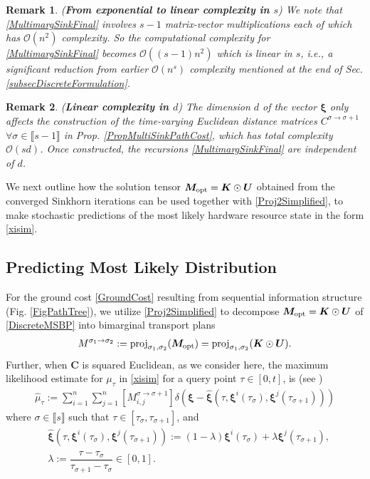 \documentclass[letterpaper, 10pt, twocolumn]{ieeeconf}      %
\newtheorem{remark}{Remark}
\begin{document}
\begin{remark}(\textbf{From exponential to linear complexity in $s$})
We note that \eqref{MultimargSinkFinal} involves $s-1$ matrix-vector multiplications each of which has $\mathcal{O}(n^2)$ complexity. So the computational complexity for \eqref {MultimargSinkFinal} becomes $\mathcal{O}\left((s-1)n^2\right)$ which is linear in $s$, i.e., a significant reduction from earlier $\mathcal{O}\left(n^{s}\right)$ complexity mentioned at the end of Sec. \ref{subsecDiscreteFormulation}.
\end{remark}
\begin{remark}(\textbf{Linear complexity in $d$})
The dimension $d$ of the vector $\bm{\xi}$ only affects the construction of the time-varying Euclidean distance matrices $C^{\sigma\rightarrow\sigma+1}$ $\forall\sigma\in\llbracket s-1\rrbracket$ in Prop. \ref{PropMultiSinkPathCost}, which has total complexity $\mathcal{O}(sd)$. Once constructed, the recursions \eqref {MultimargSinkFinal} are independent of $d$.
\end{remark}
We next outline how the solution tensor $\bm{M}_{\rm{opt}}=\bm{K}\odot\bm{U}$ obtained from the converged Sinkhorn iterations can be used together with \eqref{Proj2Simplified}, to make stochastic predictions of the most likely hardware resource state in the form \eqref{xisim}.

\subsection{Predicting Most Likely Distribution }\label{subsec:Prediction}
\noindent
For the ground cost \eqref{GroundCost} resulting from sequential information structure (Fig. \ref{FigPathTree}), we utilize \eqref{Proj2Simplified} to decompose $\bm{M}_{\rm{opt}} = \bm{K}\odot\bm{U}$ of \eqref{DiscreteMSBP} into bimarginal transport plans
\begin{align}
    M^{\sigma_1\to\sigma_2}:={\rm{proj}}_{\sigma_1,\sigma_2}(\bm{M}_{\rm{opt}})={\rm{proj}}_{\sigma_1,\sigma_2}(\bm{K}\odot\bm{U}).
\label{BimarginalPlanM}
\end{align}
Further, when $\bm{C}$ is squared Euclidean, as we consider here, the maximum likelihood estimate for $\mu_{\tau}$ in \eqref{xisim} for a query point $\tau\in[0,t]$, is (see \cite[Sec. 2.2]{elvander2020multi})
\begin{align}
    \!\hat{\mu}_\tau \!:=\!\sum_{i=1}^n\!\sum_{j=1}^n \!\left[\!M^{\sigma\to\sigma+1}_{i,j}\!\right]\!\!\delta(\bm{\xi}-\hat{\bm{\xi}}(\tau,\bm{\xi}^{i}(\tau_{\sigma}),\bm{\xi}^{j}(\tau_{\sigma+1})))
\label{MuInterpolation}
\end{align}
where $\sigma\in\llbracket s\rrbracket$ such that $\tau\in[\tau_{\sigma},\tau_{\sigma+1}]$, and
\begin{subequations}
\begin{align}
&\!\hat{\bm{\xi}}(\tau,\bm{\xi}^{i}(\tau_{\sigma}),\bm{\xi}^{j}(\tau_{\sigma+1}))\!\!:= \!(1-\lambda)\bm{\xi}^{i}(\tau_{\sigma}) \!+\! \lambda\bm{\xi}^{j}(\tau_{\sigma+1}),\\
&\lambda:=\dfrac{\tau-\tau_{\sigma}}{\tau_{\sigma+1}-\tau_{\sigma}}\in[0,1].
\end{align}
\label{defXiInterpolation}
\end{subequations}
\end{document}
